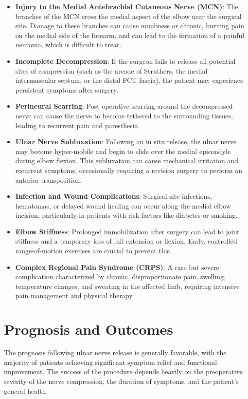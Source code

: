 \begin{itemize}
  \item \textbf{Injury to the Medial Antebrachial Cutaneous Nerve (MCN)}: The branches of the MCN cross the medial aspect of the elbow near the surgical site. Damage to these branches can cause numbness or chronic, burning pain on the medial side of the forearm, and can lead to the formation of a painful neuroma, which is difficult to treat.
  \item \textbf{Incomplete Decompression}: If the surgeon fails to release all potential sites of compression (such as the arcade of Struthers, the medial intermuscular septum, or the distal FCU fascia), the patient may experience persistent symptoms after surgery.
  \item \textbf{Perineural Scarring}: Post-operative scarring around the decompressed nerve can cause the nerve to become tethered to the surrounding tissues, leading to recurrent pain and paresthesia.
  \item \textbf{Ulnar Nerve Subluxation}: Following an in situ release, the ulnar nerve may become hyper-mobile and begin to slide over the medial epicondyle during elbow flexion. This subluxation can cause mechanical irritation and recurrent symptoms, occasionally requiring a revision surgery to perform an anterior transposition.
  \item \textbf{Infection and Wound Complications}: Surgical site infections, hematomas, or delayed wound healing can occur along the medial elbow incision, particularly in patients with risk factors like diabetes or smoking.
  \item \textbf{Elbow Stiffness}: Prolonged immobilization after surgery can lead to joint stiffness and a temporary loss of full extension or flexion. Early, controlled range-of-motion exercises are crucial to prevent this.
  \item \textbf{Complex Regional Pain Syndrome (CRPS)}: A rare but severe complication characterized by chronic, disproportionate pain, swelling, temperature changes, and sweating in the affected limb, requiring intensive pain management and physical therapy.
\end{itemize}

\section*{Prognosis and Outcomes}
The prognosis following ulnar nerve release is generally favorable, with the majority of patients achieving significant symptom relief and functional improvement. The success of the procedure depends heavily on the preoperative severity of the nerve compression, the duration of symptoms, and the patient's general health.

